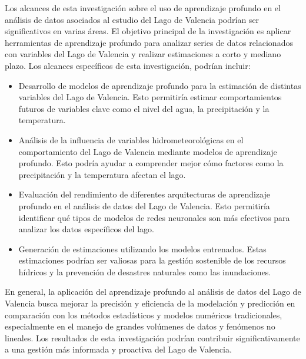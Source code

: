 \documentclass[12pt]{article}
\begin{document}
Los alcances de esta investigación sobre el uso de aprendizaje profundo en el análisis de datos asociados al estudio del Lago de Valencia podrían ser significativos en varias áreas. El objetivo principal de la investigación es aplicar herramientas de aprendizaje profundo para analizar series de datos relacionados con variables del Lago de Valencia y realizar estimaciones a corto y mediano plazo.
Los alcances específicos de esta investigación, podrían incluir:
\begin{itemize}
    \item Desarrollo de modelos de aprendizaje profundo para la estimación de distintas variables del Lago de Valencia. Esto permitiría estimar comportamientos futuros de variables clave como el nivel del agua, la precipitación y la temperatura.
    \item Análisis de la influencia de variables hidrometeorológicas en el comportamiento del Lago de Valencia mediante modelos de aprendizaje profundo. Esto podría ayudar a comprender mejor cómo factores como la precipitación y la temperatura afectan el lago.
    \item  Evaluación del rendimiento de diferentes arquitecturas de aprendizaje profundo en el análisis de datos del Lago de Valencia. Esto permitiría identificar qué tipos de modelos de redes neuronales son más efectivos para analizar los datos específicos del lago.
    \item Generación de estimaciones utilizando los modelos entrenados. Estas estimaciones podrían ser valiosas para la gestión sostenible de los recursos hídricos y la prevención de desastres naturales como las inundaciones.
\end{itemize}
En general, la aplicación del aprendizaje profundo al análisis de datos del Lago de Valencia busca mejorar la precisión y eficiencia de la modelación y predicción en comparación con los métodos estadísticos y modelos numéricos tradicionales, especialmente en el manejo de grandes volúmenes de datos y fenómenos no lineales. Los resultados de esta investigación podrían contribuir significativamente a una gestión más informada y proactiva del Lago de Valencia.
\end{document}
